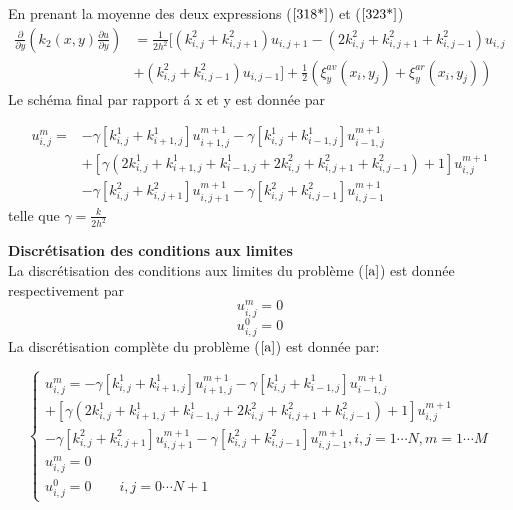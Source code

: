 \documentclass[12pt]{beamer}
\begin{document}
\begin{frame}
	En prenant la moyenne des deux expressions ($\ref{318*}$) et ($\ref{323*}$) 
	\begin{align}
\frac{\partial}{\partial{y}}(k_{2}(x,y)\frac{\partial{u}}{\partial{y}})\nonumber&=\frac{1}{2h^{2}}[ (k^{2}_{i,j}+k^{2}_{i,j+1})u_{i,j+1}-(2k^{2}_{i,j}+k^{2}_{i,j+1}+k^{2}_{i,j-1})u_{i,j}\nonumber\\&+(k^{2}_{i,j}+k^{2}_{i,j-1})u_{i,j-1}] +\frac{1}{2}(\xi^{av}_{y}(x_{i},y_{j})+\xi^{ar}_{y}(x_{i},y_{j}))\end{align}
	 Le sch\'{e}ma final par rapport \'{a} x et y est donn\'{e}e par
	  \begin{block}{}
		\begin{align}
		u^{m}_{i,j}\nonumber=&- \gamma\left[  k^{1}_{i,j}+k^{1}_{i+1,j}\right]u^{m+1}_{i+1,j}- \gamma\left[k^{1}_{i,j}+k^{1}_{i-1,j}\right]u^{m+1}_{i-1,j}\\&+ \left[ \gamma(2k^{1}_{i,j}+k^{1}_{i+1,j}+k^{1}_{i-1,j}+2k^{2}_{i,j}+k^{2}_{i,j+1}+k^{2}_{i,j-1})+1\right]u^{m+1}_{i,j}\nonumber\\
		&- \gamma\left[  k^{2}_{i,j}+k^{2}_{i,j+1}\right]u^{m+1}_{i,j+1}- \gamma\left[ k^{2}_{i,j}+k^{2}_{i,j-1}\right]u^{m+1}_{i,j-1}\label{326*}\end{align}
		telle que  $ \gamma =\frac{k}{2h^{2}}$\\
	\end{block}
\end{frame}
\begin{frame}
\textbf{Discr\'{e}tisation des conditions aux limites}\\
 La discr\'{e}tisation des conditions aux limites  du probl\`{e}me ($\ref{a}$) est donn\'{e}e respectivement par \begin{equation}u^{m}_{i,j}=0\end{equation}  \begin{equation}u^{0}_{i,j}=0\end{equation}
La discr\'{e}tisation compl\`{e}te du probl\`{e}me ($\ref{a}$) est donn\'{e}e par:
\begin{block}{}
\begin{equation}
\begin{cases}
u^{m}_{i,j}=- \gamma[  k^{1}_{i,j}+k^{1}_{i+1,j}]u^{m+1}_{i+1,j}- \gamma[k^{1}_{i,j}+k^{1}_{i-1,j}]u^{m+1}_{i-1,j}\\+\left[ \gamma(2k^{1}_{i,j}+k^{1}_{i+1,j}+k^{1}_{i-1,j}+2k^{2}_{i,j}+k^{2}_{i,j+1}+k^{2}_{i,j-1})+1\right] u^{m+1}_{i,j}\\- \gamma[  k^{2}_{i,j}+k^{2}_{i,j+1}]u^{m+1}_{i,j+1}- \gamma[k^{2}_{i,j}+k^{2}_{i,j-1}]u^{m+1}_{i,j-1}, i,j=1\cdots N, m=1\cdots M\\
u^{m}_{i,j}=0\qquad \\
u^{0}_{i,j}=0\qquad i,j=0\cdots N+1
\end{cases}
\end{equation}
\end{block}
\end{frame}
\end{document}
